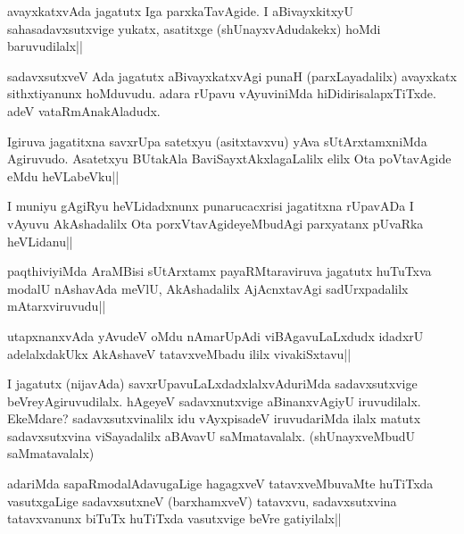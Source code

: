 \begin{artha}%
avayxkatxvAda jagatutx Iga parxkaTavAgide. I aBivayxkitxyU sahasadavxsutxvige yukatx, asatitxge (shUnayxvAdudakekx) hoMdi baruvudilalx||
\end{artha}

\begin{artha}
sadavxsutxveV Ada jagatutx aBivayxkatxvAgi punaH (parxLayadalilx) avayxkatx sithxtiyanunx hoMduvudu. adara rUpavu vAyuviniMda hiDidirisalapxTiTxde. adeV vataRmAnakAladudx. 
\end{artha}


\begin{artha}
Igiruva jagatitxna savxrUpa satetxyu (asitxtavxvu) yAva sUtArxtamxniMda Agiruvudo. Asatetxyu BUtakAla BaviSayxtAkxlagaLalilx elilx Ota poVtavAgide eMdu heVLabeVku||
\end{artha}

\begin{artha}
I muniyu gAgiRyu heVLidadxnunx punarucacxrisi jagatitxna rUpavADa I vAyuvu AkAshadalilx Ota porxVtavAgideyeMbudAgi parxyatanx pUvaRka heVLidanu||
\end{artha}%

\begin{artha}
paqthiviyiMda AraMBisi sUtArxtamx payaRMtaraviruva jagatutx huTuTxva modalU nAshavAda meVlU, AkAshadalilx AjAcnxtavAgi sadUrxpadalilx mAtarxviruvudu||
\end{artha}

\begin{artha}
utapxnanxvAda yAvudeV oMdu nAmarUpAdi viBAgavuLaLxdudx idadxrU adelalxdakUkx AkAshaveV tatavxveMbadu ililx vivakiSxtavu||
\end{artha}

\begin{artha}
I jagatutx (nijavAda) savxrUpavuLaLxdadxlalxvAduriMda sadavxsutxvige beVreyAgiruvudilalx. hAgeyeV sadavxnutxvige aBinanxvAgiyU iruvudilalx. EkeMdare? sadavxsutxvinalilx idu vAyxpisadeV iruvudariMda ilalx matutx sadavxsutxvina viSayadalilx aBAvavU saMmatavalalx. (shUnayxveMbudU saMmatavalalx) 
\end{artha}


\begin{artha}%
adariMda sapaRmodalAdavugaLige hagagxveV tatavxveMbuvaMte huTiTxda vasutxgaLige sadavxsutxneV (barxhamxveV) tatavxvu, sadavxsutxvina tatavxvanunx biTuTx huTiTxda vasutxvige beVre gatiyilalx||
\end{artha}

